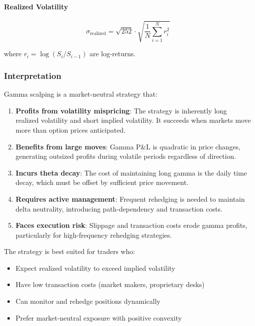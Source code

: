\paragraph{Realized Volatility}

\[
\sigma_{\text{realized}} = \sqrt{252} \cdot \sqrt{\frac{1}{N} \sum_{i=1}^{N} r_i^2}
\]

where $r_i = \log(S_i / S_{i-1})$ are log-returns.

\subsubsection{Interpretation}

Gamma scalping is a market-neutral strategy that:

\begin{enumerate}
  \item \textbf{Profits from volatility mispricing}: The strategy is inherently long realized volatility and short implied volatility. It succeeds when markets move more than option prices anticipated.

  \item \textbf{Benefits from large moves}: Gamma P\&L is quadratic in price changes, generating outsized profits during volatile periods regardless of direction.

  \item \textbf{Incurs theta decay}: The cost of maintaining long gamma is the daily time decay, which must be offset by sufficient price movement.

  \item \textbf{Requires active management}: Frequent rehedging is needed to maintain delta neutrality, introducing path-dependency and transaction costs.

  \item \textbf{Faces execution risk}: Slippage and transaction costs erode gamma profits, particularly for high-frequency rehedging strategies.
\end{enumerate}

The strategy is best suited for traders who:
\begin{itemize}
  \item Expect realized volatility to exceed implied volatility
  \item Have low transaction costs (market makers, proprietary desks)
  \item Can monitor and rehedge positions dynamically
  \item Prefer market-neutral exposure with positive convexity
\end{itemize}

